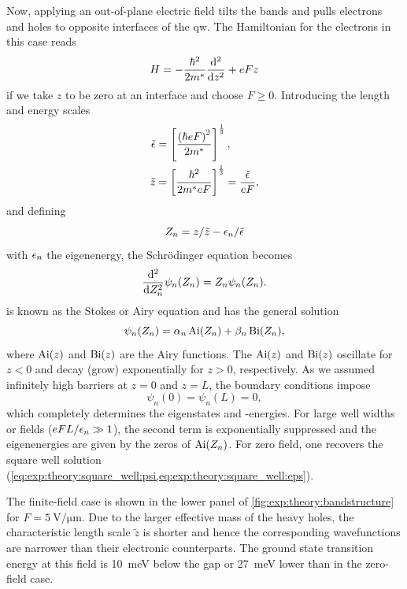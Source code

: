 Now, applying an out-of-plane electric field tilts the bands and pulls electrons and holes to opposite interfaces of the \gls{qw}.
The Hamiltonian for the electrons in this case reads~\cite{Rabinovitch1971,Miller1985,Davies2009}
\begin{equation}\label{eq:exp:theory:qcse:hamiltonian}
    H = -\frac{\hbar^2}{2m^\ast}\dv[2]{z} + eFz
\end{equation}
if we take $z$ to be zero at an interface and choose $F \geq 0$.
Introducing the length and energy scales~\cite{Davies2009}
\begin{align}
    \tilde{\epsilon} &= \left[\frac{\left(\hbar eF\right)^2}{2m^\ast}\right]^{\frac{1}{3}}, \\
    \tilde{z} &= \left[\frac{\hbar^2}{2m^\ast eF}\right]^{\frac{1}{3}} = \frac{\tilde{\epsilon}}{eF},
\end{align}
and defining
\begin{equation}
    Z_n = z/\tilde{z} - \epsilon_n/\tilde{\epsilon}
\end{equation}
with $\epsilon_n$ the eigenenergy, the Schrödinger equation becomes~\cite{Rabinovitch1971}
\begin{equation}\label{eq:exp:theory:qcse:se}
    \dv[2]{Z_n}\psi_n(Z_n) = Z_n\psi_n(Z_n).
\end{equation}
 is known as the Stokes or Airy equation and has the general solution
\begin{equation}
    \psi_n(Z_n) = \alpha_n\operatorname{Ai}(Z_n) + \beta_n\operatorname{Bi}(Z_n),
\end{equation}
where $\operatorname{Ai}(z)$ and $\operatorname{Bi}(z)$ are the Airy functions.
The $\operatorname{Ai}(z)$ and $\operatorname{Bi}(z)$ oscillate for $z < 0$ and decay (grow) exponentially for $z > 0$, respectively.
As we assumed infinitely high barriers at $z = 0$ and $z = L$, the boundary conditions impose
\begin{equation}
    \psi_n(0) = \psi_n(L) = 0,
\end{equation}
which completely determines the eigenstates and -energies.
For large well widths or fields ($eFL/\epsilon_n\gg 1$), the second term is exponentially suppressed and the eigenenergies are given by the zeros of $\operatorname{Ai}(Z_n)$.
For zero field, one recovers the square well solution (\cref{eq:exp:theory:square_well:psi,eq:exp:theory:square_well:eps}).

The finite-field case is shown in the lower panel of \cref{fig:exp:theory:bandstructure} for $F=\qty{5}{\volt\per\micro\meter}$.
Due to the larger effective mass of the heavy holes, the characteristic length scale $\tilde{z}$ is shorter and hence the corresponding wavefunctions are narrower than their electronic counterparts.
The ground state transition energy at this field is \qty{10}{\milli\electronvolt} below the gap or \qty{27}{\milli\electronvolt} lower than in the zero-field case.

